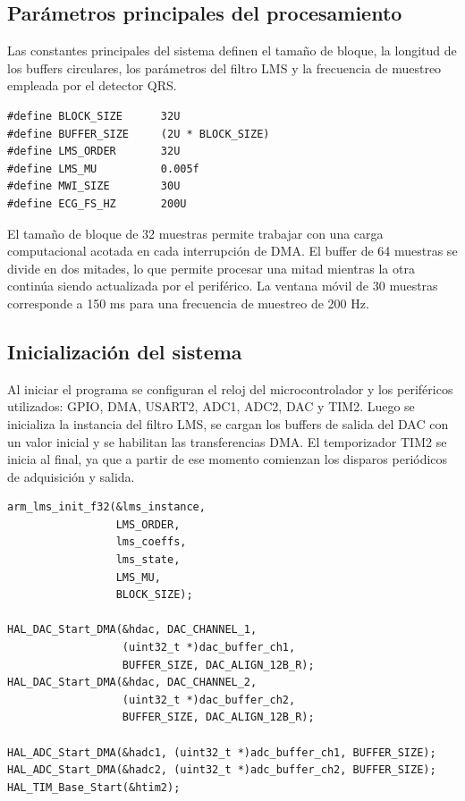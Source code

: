 \documentclass[12pt]{article}
\begin{document}
		\subsection{Parámetros principales del procesamiento}

		Las constantes principales del sistema definen el tamaño de bloque, la longitud de los buffers circulares, los parámetros del filtro LMS y la frecuencia de muestreo empleada por el detector QRS.

		\begin{lstlisting}[style=mystyle, caption={Constantes principales del procesamiento.}]
#define BLOCK_SIZE      32U
#define BUFFER_SIZE     (2U * BLOCK_SIZE)
#define LMS_ORDER       32U
#define LMS_MU          0.005f
#define MWI_SIZE        30U
#define ECG_FS_HZ       200U
		\end{lstlisting}

		El tamaño de bloque de 32 muestras permite trabajar con una carga computacional acotada en cada interrupción de DMA. El buffer de 64 muestras se divide en dos mitades, lo que permite procesar una mitad mientras la otra continúa siendo actualizada por el periférico. La ventana móvil de 30 muestras corresponde a 150 ms para una frecuencia de muestreo de 200 Hz.

		\subsection{Inicialización del sistema}

		Al iniciar el programa se configuran el reloj del microcontrolador y los periféricos utilizados: GPIO, DMA, USART2, ADC1, ADC2, DAC y TIM2. Luego se inicializa la instancia del filtro LMS, se cargan los buffers de salida del DAC con un valor inicial y se habilitan las transferencias DMA. El temporizador TIM2 se inicia al final, ya que a partir de ese momento comienzan los disparos periódicos de adquisición y salida.

		\begin{lstlisting}[style=mystyle, caption={Secuencia general de arranque del sistema.}]
arm_lms_init_f32(&lms_instance,
                 LMS_ORDER,
                 lms_coeffs,
                 lms_state,
                 LMS_MU,
                 BLOCK_SIZE);

HAL_DAC_Start_DMA(&hdac, DAC_CHANNEL_1,
                  (uint32_t *)dac_buffer_ch1,
                  BUFFER_SIZE, DAC_ALIGN_12B_R);
HAL_DAC_Start_DMA(&hdac, DAC_CHANNEL_2,
                  (uint32_t *)dac_buffer_ch2,
                  BUFFER_SIZE, DAC_ALIGN_12B_R);

HAL_ADC_Start_DMA(&hadc1, (uint32_t *)adc_buffer_ch1, BUFFER_SIZE);
HAL_ADC_Start_DMA(&hadc2, (uint32_t *)adc_buffer_ch2, BUFFER_SIZE);
HAL_TIM_Base_Start(&htim2);
		\end{lstlisting}
\end{document}
